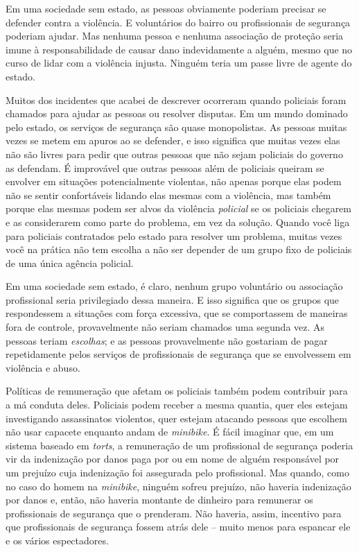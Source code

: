 Em uma sociedade sem estado, as pessoas obviamente poderiam precisar se defender contra a violência. E voluntários do bairro ou profissionais de segurança poderiam ajudar. Mas nenhuma pessoa e nenhuma associação de proteção seria imune à responsabilidade de causar dano indevidamente a alguém, mesmo que no curso de lidar com a violência injusta. Ninguém teria um passe livre de agente do estado.

Muitos dos incidentes que acabei de descrever ocorreram quando policiais foram chamados para ajudar as pessoas ou resolver disputas. Em um mundo dominado pelo estado, os serviços de segurança são quase monopolistas. As pessoas muitas vezes se metem em apuros ao se defender, e isso significa que muitas vezes elas não são livres para pedir que outras pessoas que não sejam policiais do governo as defendam. É improvável que outras pessoas além de policiais queiram se envolver em situações potencialmente violentas, não apenas porque elas podem não se sentir confortáveis lidando elas mesmas com a violência, mas também porque elas mesmas podem ser alvos da violência \emph{policial} se os policiais chegarem e as considerarem como parte do problema, em vez da solução. Quando você liga para policiais contratados pelo estado para resolver um problema, muitas vezes você na prática não tem escolha a não ser depender de um grupo fixo de policiais de uma única agência policial. 

Em uma sociedade sem estado, é claro, nenhum grupo voluntário ou associação profissional seria privilegiado dessa maneira. E isso significa que os grupos que respondessem a situações com força excessiva, que se comportassem de maneiras fora de controle, provavelmente não seriam chamados uma segunda vez. As pessoas teriam \emph{escolhas}; e as pessoas provavelmente não gostariam de pagar repetidamente pelos serviços de profissionais de segurança que se envolvessem em violência e abuso.

Políticas de remuneração que afetam os policiais também podem contribuir para a má conduta deles. Policiais podem receber a mesma quantia, quer eles estejam investigando assassinatos violentos, quer estejam atacando pessoas que escolhem não usar capacete enquanto andam de \emph{minibike}. É fácil imaginar que, em um sistema baseado em \emph{torts}, a remuneração de um profissional de segurança poderia vir da indenização por danos paga por ou em nome de alguém responsável por um prejuízo cuja indenização foi assegurada pelo profissional. Mas quando, como no caso do homem na \emph{minibike}, ninguém sofreu prejuízo, não haveria indenização por danos e, então, não haveria montante de dinheiro para remunerar os profissionais de segurança que o prenderam. Não haveria, assim, incentivo para que profissionais de segurança fossem atrás dele -- muito menos para espancar ele e os vários espectadores.

